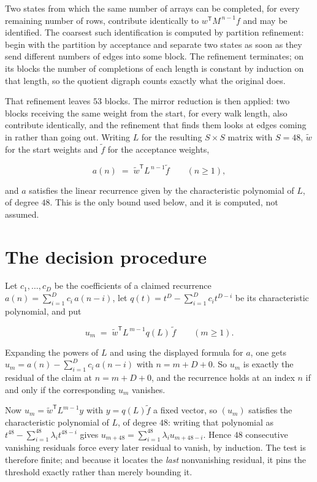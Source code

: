 \documentclass[11pt]{article}
\theoremstyle{definition}
\begin{document}
Two states from which the same number of arrays can be completed, for every remaining number of rows, contribute identically to $w^{\mathsf T}M^{\,n-1}f$ and may be identified. The coarsest such identification is computed by partition refinement: begin with the partition by acceptance and separate two states as soon as they send different numbers of edges into some block. The refinement terminates; on its blocks the number of completions of each length is constant by induction on that length, so the quotient digraph counts exactly what the original does.

That refinement leaves $53$ blocks. The mirror reduction is then applied: two blocks receiving the same weight from the start, for every walk length, also contribute identically, and the refinement that finds them looks at edges coming in rather than going out. Writing $L$ for the resulting $S \times S$ matrix with $S = 48$, $\tilde w$ for the start weights and $\tilde f$ for the acceptance weights,

\[a(n) \;=\; \tilde w^{\mathsf T} L^{\,n-1} \tilde f \qquad (n \ge 1),\]

and $a$ satisfies the linear recurrence given by the characteristic polynomial of $L$, of degree $48$. This is the only bound used below, and it is computed, not assumed.

\section{The decision procedure}

Let $c_1,\dots,c_D$ be the coefficients of a claimed recurrence $a(n) = \sum_{i=1}^{D} c_i\,a(n-i)$, let $q(t) = t^{D} - \sum_{i=1}^{D} c_i t^{D-i}$ be its characteristic polynomial, and put

\[u_m \;=\; \tilde w^{\mathsf T} L^{\,m-1} q(L)\,\tilde f \qquad (m \ge 1).\]

Expanding the powers of $L$ and using the displayed formula for $a$, one gets $u_m = a(n) - \sum_{i=1}^{D} c_i\,a(n-i)$ with $n = m + D + 0$. So $u_m$ is exactly the residual of the claim at $n = m + D + 0$, and the recurrence holds at an index $n$ if and only if the corresponding $u_m$ vanishes.

Now $u_m = \tilde w^{\mathsf T} L^{m-1} y$ with $y = q(L)\tilde f$ a fixed vector, so $(u_m)$ satisfies the characteristic polynomial of $L$, of degree $48$: writing that polynomial as $t^{48} - \sum_{i=1}^{48} \lambda_i t^{48-i}$ gives $u_{m+48} = \sum_{i=1}^{48} \lambda_i u_{m+48-i}$. Hence $48$ consecutive vanishing residuals force every later residual to vanish, by induction. The test is therefore finite; and because it locates the {\itshape last} nonvanishing residual, it pins the threshold exactly rather than merely bounding it.
\end{document}
